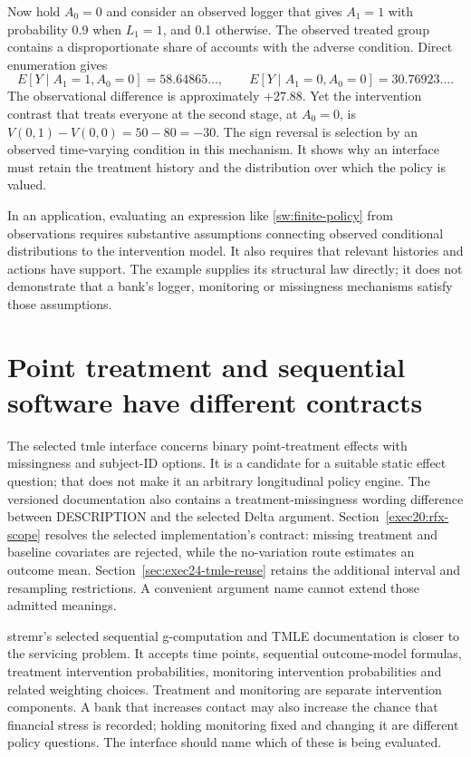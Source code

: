 Now hold \(A_0=0\) and consider an observed logger that gives \(A_1=1\) with
probability 0.9 when \(L_1=1\), and 0.1 otherwise. The observed treated group
contains a disproportionate share of accounts with the adverse condition.
Direct enumeration gives
\[
 E[Y\mid A_1=1,A_0=0]=58.64865\ldots,
 \qquad E[Y\mid A_1=0,A_0=0]=30.76923\ldots.
\]
The observational difference is approximately \(+27.88\). Yet the intervention
contrast that treats everyone at the second stage, at \(A_0=0\), is
\(V(0,1)-V(0,0)=50-80=-30\). The sign reversal is selection by an observed
time-varying condition in this mechanism. It shows why an interface must retain
the treatment history and the distribution over which the policy is valued.

In an application, evaluating an expression like
\eqref{sw:finite-policy} from observations requires substantive assumptions
connecting observed conditional distributions to the intervention model. It
also requires that relevant histories and actions have support. The example
supplies its structural law directly; it does not demonstrate that a bank's
logger, monitoring or missingness mechanisms satisfy those assumptions.

\section{Point treatment and sequential software have different contracts}

The selected tmle interface concerns binary point-treatment effects with
missingness and subject-ID options. It is a candidate for a suitable static
effect question; that does not make it an arbitrary longitudinal policy engine.
The versioned documentation also contains a treatment-missingness wording
difference between DESCRIPTION and the selected Delta argument.
Section~\ref{exec20:rfx-scope} resolves the selected implementation's contract:
missing treatment and baseline covariates are rejected, while the no-variation
route estimates an outcome mean. Section~\ref{sec:exec24-tmle-reuse} retains
the additional interval and resampling restrictions. A convenient argument
name cannot extend those admitted meanings. \citep{v12_sw_tmle}

stremr's selected sequential g-computation and TMLE documentation is closer to
the servicing problem. It accepts time points, sequential outcome-model
formulas, treatment intervention probabilities, monitoring intervention
probabilities and related weighting choices. Treatment and monitoring are
separate intervention components. A bank that increases contact may also
increase the chance that financial stress is recorded; holding monitoring
fixed and changing it are different policy questions. The interface should
name which of these is being evaluated. \citep{v12_sw_stremr}

